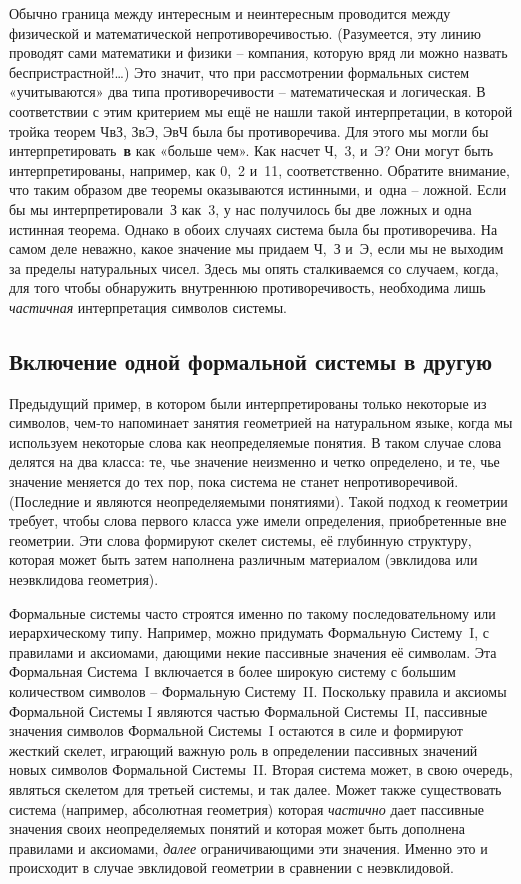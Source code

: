 \documentclass[../main.tex]{subfiles}
\begin{document}
Обычно граница между интересным и неинтересным проводится между физической и математической непротиворечивостью. (Разумеется, эту линию проводят сами математики и физики \--- компания, которую вряд ли можно назвать беспристрастной!\ldots) Это значит, что при рассмотрении формальных систем «учитываются» два типа противоречивости \--- математическая и логическая. В соответствии с этим критерием мы ещё не нашли такой интерпретации, в которой тройка теорем ЧвЗ, ЗвЭ, ЭвЧ была бы противоречива. Для этого мы могли бы интерпретировать~\textbf{в} как «больше чем». Как насчет Ч,~3, и~Э? Они могут быть интерпретированы, например, как 0,~2 и~11, соответственно. Обратите внимание, что таким образом две теоремы оказываются истинными, и~одна \--- ложной. Если бы мы интерпретировали~З как~3, у нас получилось бы две ложных и одна истинная теорема. Однако в обоих случаях система была бы противоречива. На самом деле неважно, какое значение мы придаем Ч,~З и~Э, если мы не выходим за пределы натуральных чисел. Здесь мы опять сталкиваемся со случаем, когда, для того чтобы обнаружить внутреннюю противоречивость, необходима лишь \emph{частичная} интерпретация символов системы.


\subsection{Включение одной формальной системы в другую}

Предыдущий пример, в котором были интерпретированы только некоторые из символов, чем-то напоминает занятия геометрией на натуральном языке, когда мы используем некоторые слова как неопределяемые понятия. В таком случае слова делятся на два класса: те, чье значение неизменно и четко определено, и те, чье значение меняется до тех пор, пока система не станет непротиворечивой. (Последние и являются неопределяемыми понятиями). Такой подход к геометрии требует, чтобы слова первого класса уже имели определения, приобретенные вне геометрии. Эти слова формируют скелет системы, её глубинную структуру, которая может быть затем наполнена различным материалом (эвклидова или неэвклидова геометрия).

Формальные системы часто строятся именно по такому последовательному или иерархическому типу. Например, можно придумать Формальную Систему~I, с правилами и аксиомами, дающими некие пассивные значения её символам. Эта Формальная Система~I включается в более широкую систему с большим количеством символов \--- Формальную Систему~II. Поскольку правила и аксиомы Формальной Системы I являются частью Формальной Системы~II, пассивные значения символов Формальной Системы~I остаются в силе и формируют жесткий скелет, играющий важную роль в определении пассивных значений новых символов Формальной Системы~II. Вторая система может, в свою очередь, являться скелетом для третьей системы, и так далее. Может также существовать система (например, абсолютная геометрия) которая \emph{частично} дает пассивные значения своих неопределяемых понятий и которая может быть дополнена правилами и аксиомами, \emph{далее} ограничивающими эти значения. Именно это и происходит в случае эвклидовой геометрии в сравнении с неэвклидовой.
\end{document}
